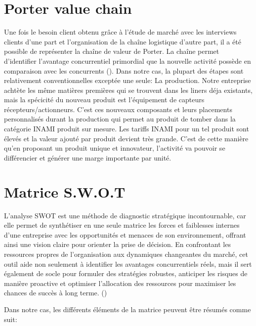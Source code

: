 \section{Porter value chain}

Une fois le besoin client obtenu grâce à l'étude de marché avec les interviews clients d'une part et l'organisation de la chaîne logistique d'autre part, il a été possible de représenter la chaîne de valeur de Porter. La chaîne permet d'identifier l'avantage concurrentiel primordial que la nouvelle activité possède en comparaison avec les concurrents (\cite{ref:lambin}). Dans notre cas, la plupart des étapes sont relativement conventionnelles exceptée une seule: La production. Notre entreprise achtète les même matières premières qui se trouvent dans les liners déja existants, mais la spécicité du nouveau produit est l'équipement de capteurs récepteurs/actionneurs. C'est ces nouveaux composants et leurs placements personnalisés durant la production qui permet au produit de tomber dans la catégorie INAMI produit sur mesure. Les tariffs INAMI pour un tel produit sont élevés et la valeur ajouté par produit devient très grande. C'est de cette manière qu'en proposant un produit unique et innovateur, l'activité va pouvoir se différencier et générer une marge importante par unité.

\section{Matrice S.W.O.T}
L’analyse SWOT est une méthode de diagnostic stratégique incontournable, car elle permet de synthétiser en une seule matrice les forces et faiblesses internes d’une entreprise avec les opportunités et menaces de son environnement, offrant ainsi une vision claire pour orienter la prise de décision. En confrontant les ressources propres de l’organisation aux dynamiques changeantes du marché, cet outil aide non seulement à identifier les avantages concurrentiels réels, mais il sert également de socle pour formuler des stratégies robustes, anticiper les risques de manière proactive et optimiser l’allocation des ressources pour maximiser les chances de succès à long terme. (\cite{ref:lambin}) 

Dans notre cas, les différents éléments de la matrice peuvent être résumés comme suit:

